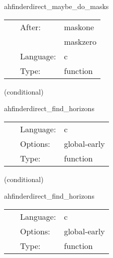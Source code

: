 \vspace{5mm}


\hspace{5mm} ahfinderdirect\_maybe\_do\_masks 

\hspace{5mm}{\it set mask(s) based on apparent horizon position(s) } 


\hspace{5mm}

 \begin{tabular*}{160mm}{cll} 
~ & After:  & maskone \\ 
~& ~ &maskzero\\ 
~ & Language:  & c \\ 
~ & Type:  & function \\ 
\end{tabular*} 


\vspace{5mm}

   (conditional) 

\hspace{5mm} ahfinderdirect\_find\_horizons 

\hspace{5mm}{\it find apparent horizon(s) after this time step } 


\hspace{5mm}

 \begin{tabular*}{160mm}{cll} 
~ & Language:  & c \\ 
~ & Options:  & global-early \\ 
~ & Type:  & function \\ 
\end{tabular*} 


\vspace{5mm}

   (conditional) 

\hspace{5mm} ahfinderdirect\_find\_horizons 

\hspace{5mm}{\it find apparent horizon(s) after this time step } 


\hspace{5mm}

 \begin{tabular*}{160mm}{cll} 
~ & Language:  & c \\ 
~ & Options:  & global-early \\ 
~ & Type:  & function \\ 
\end{tabular*} 


